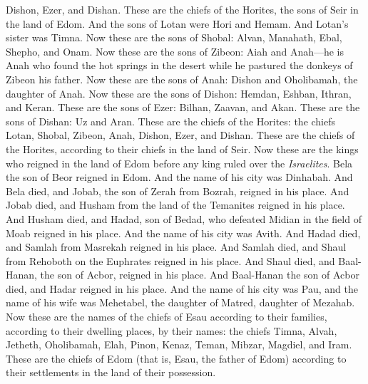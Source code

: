 \begin{biblechapter}
\verse Dishon, Ezer, and Dishan. These are the chiefs of the Horites, the sons of Seir in the land of Edom.
\verse And the sons of Lotan were Hori and Hemam. And Lotan’s sister was Timna.
\verse Now these are the sons of Shobal: Alvan, Manahath, Ebal, Shepho, and Onam.
\verse Now these are the sons of Zibeon: Aiah and Anah—he is Anah who found the hot springs in the desert while he pastured the donkeys of Zibeon his father.
\verse Now these are the sons of Anah: Dishon and Oholibamah, the daughter of Anah.
\verse Now these are the sons of Dishon: Hemdan, Eshban, Ithran, and Keran.
\verse These are the sons of Ezer: Bilhan, Zaavan, and Akan.
\verse These are the sons of Dishan: Uz and Aran.
\verse These are the chiefs of the Horites: the chiefs Lotan, Shobal, Zibeon, Anah,
\verse Dishon, Ezer, and Dishan. These are the chiefs of the Horites, according to their chiefs in the land of Seir.
 Now these are the kings who reigned in the land of Edom before any king ruled over the \textit{Israelites}.
\verse Bela the son of Beor reigned in Edom. And the name of his city was Dinhabah.
\verse And Bela died, and Jobab, the son of Zerah from Bozrah, reigned in his place.
\verse And Jobab died, and Husham from the land of the Temanites reigned in his place.
\verse And Husham died, and Hadad, son of Bedad, who defeated Midian in the field of Moab reigned in his place. And the name of his city was Avith.
\verse And Hadad died, and Samlah from Masrekah reigned in his place.
\verse And Samlah died, and Shaul from Rehoboth on the Euphrates reigned in his place.
\verse And Shaul died, and Baal-Hanan, the son of Acbor, reigned in his place.
\verse And Baal-Hanan the son of Acbor died, and Hadar reigned in his place. And the name of his city was Pau, and the name of his wife was Mehetabel, the daughter of Matred, daughter of Mezahab.
\verse Now these are the names of the chiefs of Esau according to their families, according to their dwelling places, by their names: the chiefs Timna, Alvah, Jetheth,
\verse Oholibamah, Elah, Pinon,
\verse Kenaz, Teman, Mibzar,
\verse Magdiel, and Iram. These are the chiefs of Edom (that is, Esau, the father of Edom) according to their settlements in the land of their possession.
\end{biblechapter}

